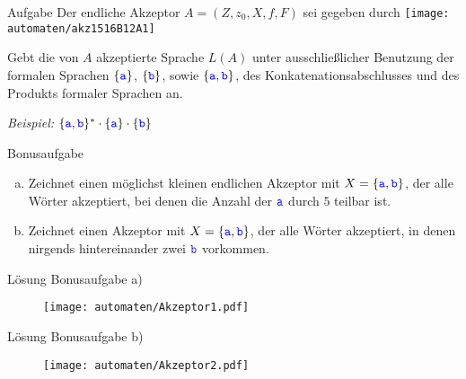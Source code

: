 \begin{frame}{Aufgabe}
	Der endliche Akzeptor $A = (Z, z_0, X, f, F)$ sei gegeben durch
	\texttt{[image: automaten/akz1516B12A1]}
	
	Gebt die von $A$ akzeptierte Sprache $L(A)$ unter ausschließlicher Benutzung der formalen Sprachen $\{\hbox{\textcolor{blue}{\texttt{a}}}\}$, $\{\hbox{\textcolor{blue}{\texttt{b}}}\}$, sowie $\{\hbox{\textcolor{blue}{\texttt{a}}}, \hbox{\textcolor{blue}{\texttt{b}}}\}$, des Konkatenationsabschlusses und des Produkts formaler Sprachen an.
	
	\emph{Beispiel:} $\{\hbox{\textcolor{blue}{\texttt{a}}}, \hbox{\textcolor{blue}{\texttt{b}}}\}^* \cdot \{\hbox{\textcolor{blue}{\texttt{a}}}\} \cdot \{\hbox{\textcolor{blue}{\texttt{b}}}\}$
	
\end{frame}

\begin{frame}{Bonusaufgabe}
	\begin{enumerate}[a)]
		\item Zeichnet einen möglichst kleinen endlichen Akzeptor mit $ X = \{\hbox{\textcolor{blue}{\texttt{a}}}, \hbox{\textcolor{blue}{\texttt{b}}}\}$, der alle Wörter akzeptiert, bei denen die Anzahl der $\hbox{\textcolor{blue}{\texttt{a}}}$ durch $5$ teilbar ist.
		\item Zeichnet einen Akzeptor mit $ X = \{\hbox{\textcolor{blue}{\texttt{a}}},\hbox{\textcolor{blue}{\texttt{b}}}\}$, der alle Wörter akzeptiert, in denen nirgends hintereinander zwei $\hbox{\textcolor{blue}{\texttt{b}}}$ vorkommen.
	\end{enumerate}		
\end{frame}

\begin{frame} {Lösung Bonusaufgabe a)}
	\begin{figure}[H] \texttt{[image: automaten/Akzeptor1.pdf]} \end{figure}		
\end{frame} 

\begin{frame}{Lösung Bonusaufgabe b)}
	\begin{figure}[H] \texttt{[image: automaten/Akzeptor2.pdf]} \end{figure}
\end{frame}

